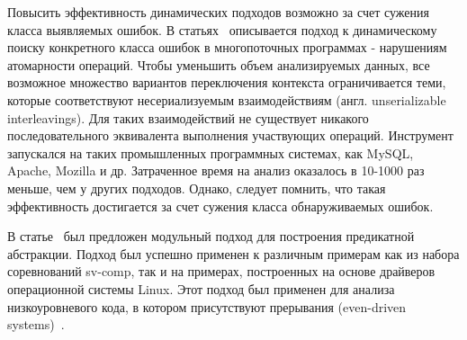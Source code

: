 Повысить эффективность динамических подходов возможно за счет сужения класса выявляемых ошибок.
В статьях~\cite{Park:2009:ASPLOS,Park:2009:SIGARCH,Park:2009} описывается подход к динамическому поиску конкретного класса ошибок в многопоточных программах - нарушениям атомарности операций.
Чтобы уменьшить объем анализируемых данных, все возможное множество вариантов переключения контекста ограничивается теми, которые соответствуют несериализуемым взаимодействиям (англ. unserializable interleavings).
Для таких взаимодействий не существует никакого последовательного эквивалента выполнения участвующих операций.
Инструмент запускался на таких промышленных программных системах, как MySQL, Apache, Mozilla и др.
Затраченное время на анализ оказалось в 10-1000 раз меньше, чем у других подходов. 
Однако, следует помнить, что такая эффективность достигается за счет сужения класса обнаруживаемых ошибок.


В статье~\cite{Kusano:2016:FCT} был предложен модульный подход для построения предикатной абстракции.
Подход был успешно применен к различным примерам как из набора соревнований sv-comp, так и на примерах, построенных на основе драйверов операционной системы Linux.
Этот подход был применен для анализа низкоуровневого кода, в котором присутствуют прерывания (even-driven systems)~\cite{Sung:2017}.

